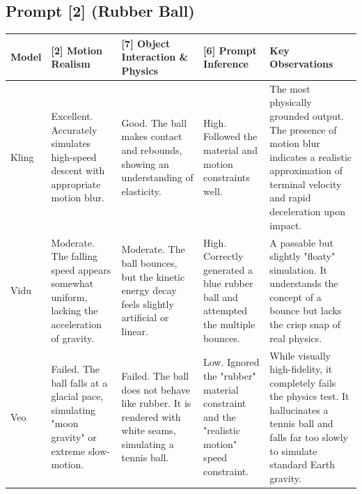 \documentclass[sigconf]{acmart}
\begin{document}
\subsection*{Prompt [2] (Rubber Ball)}
\begin{table}[t]
    \centering
    \renewcommand{\arraystretch}{1.3}
    \begin{tabularx}{\textwidth}{| l | >{\raggedright\arraybackslash}X | >{\raggedright\arraybackslash}X | >{\raggedright\arraybackslash}X | >{\raggedright\arraybackslash}X |}
        \hline
        \textbf{Model} & \textbf{[2] Motion Realism}                                                                 & \textbf{[7] Object Interaction \& Physics}                                                               & \textbf{[6] Prompt Inference}                                                              & \textbf{Key Observations}                                                                                                                                      \\ \hline
        Kling          & Excellent. Accurately simulates high-speed descent with appropriate motion blur.            & Good. The ball makes contact and rebounds, showing an understanding of elasticity.                       & High. Followed the material and motion constraints well.                                   & The most physically grounded output. The presence of motion blur indicates a realistic approximation of terminal velocity and rapid deceleration upon impact.  \\ \hline
        Vidu           & Moderate. The falling speed appears somewhat uniform, lacking the acceleration of gravity.  & Moderate. The ball bounces, but the kinetic energy decay feels slightly artificial or linear.            & High. Correctly generated a blue rubber ball and attempted the multiple bounces.           & A passable but slightly "floaty" simulation. It understands the concept of a bounce but lacks the crisp snap of real physics.                                  \\ \hline
        Veo            & Failed. The ball falls at a glacial pace, simulating "moon gravity" or extreme slow-motion. & Failed. The ball does not behave like rubber. It is rendered with white seams, simulating a tennis ball. & Low. Ignored the "rubber" material constraint and the "realistic motion" speed constraint. & While visually high-fidelity, it completely fails the physics test. It hallucinates a tennis ball and falls far too slowly to simulate standard Earth gravity. \\ \hline

\end{tabularx}
\end{table}
\end{document}

